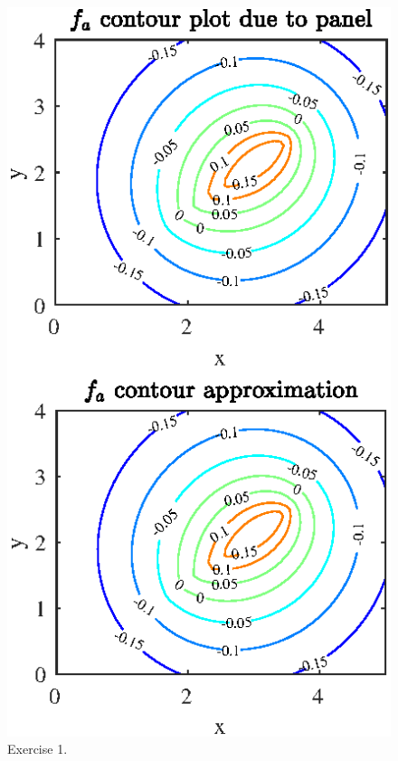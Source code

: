 


  

\begin{figure}[htbp]
\centering
\includegraphics[scale=1]{graphs/e3g1.eps}
\caption{Exercise 1.}
\label{Exercise 2}
\end{figure}

